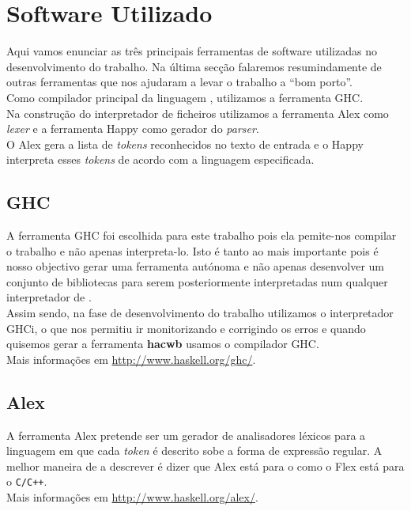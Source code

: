 \section{Software Utilizado}
Aqui vamos enunciar as três principais ferramentas de software utilizadas no desenvolvimento do trabalho. Na última secção falaremos resumindamente de outras ferramentas que nos ajudaram a levar o trabalho a ``bom porto''.  \\
Como compilador principal da linguagem \haskell, utilizamos a ferramenta \textsf{GHC}. \\
Na construção do interpretador de ficheiros utilizamos a ferramenta \textsf{Alex} como \textit{lexer} e a ferramenta \textsf{Happy} como gerador do \textit{parser}.\\
O \textsf{Alex} gera a lista de \textit{tokens} reconhecidos no texto de entrada e o \textsf{Happy} interpreta esses \textit{tokens} de acordo com a linguagem especificada.

\subsection{GHC}
A ferramenta \textsf{GHC} foi escolhida para este trabalho pois ela pemite-nos compilar o trabalho e não apenas interpreta-lo. Isto é tanto ao mais importante pois é nosso objectivo gerar uma ferramenta autónoma e não apenas desenvolver um conjunto de bibliotecas para serem posteriormente interpretadas num qualquer interpretador de \haskell.\\
Assim sendo, na fase de desenvolvimento do trabalho utilizamos o interpretador \textsf{GHCi}, o que nos permitiu ir monitorizando e corrigindo os erros e quando quisemos gerar a ferramenta \textbf{hacwb} usamos o compilador \textsf{GHC}.\\
Mais informações em \url{http://www.haskell.org/ghc/}.

\subsection{Alex}
A ferramenta \textsf{Alex} pretende ser um gerador de analisadores léxicos para a linguagem {\haskell} em que cada \textit{token} é descrito sobe a forma de expressão regular. A melhor maneira de a descrever é dizer que \textsf{Alex} está para o {\haskell} como o \textsf{Flex} está para o \texttt{C/C++}.\\
Mais informações em \url{http://www.haskell.org/alex/}.

